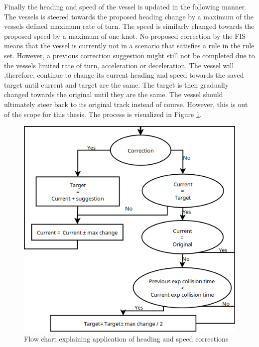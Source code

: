 Finally the heading and speed of the vessel is updated in the following manner. The vessels is steered towards the proposed heading change by a maximum of the vessels defined maximum rate of turn. The speed is similarly changed towards the proposed speed by a maximum of one knot. No proposed correction by the FIS means that the vessel is currently not in a scenario that satisfies a rule in the rule set. However, a previous correction suggestion might still not be completed due to the vessels limited rate of turn, acceleration or deceleration.  The vessel will ,therefore, continue to change its current heading and speed towards the saved target until current and target are the same. The target is then gradually changed towards the original until they are the same. The vessel should ultimately steer back to its original track instead of course. However, this is out of the scope for this thesis. The process is visualized in Figure \ref{fig:flow_chart}.
\begin{figure}[H]
    \centering
    \includegraphics[width=\textwidth,height=0.75\textheight,keepaspectratio]{Figures/flow.png}
    \caption{Flow chart explaining application of heading and speed corrections}
    \label{fig:flow_chart}
\end{figure}


